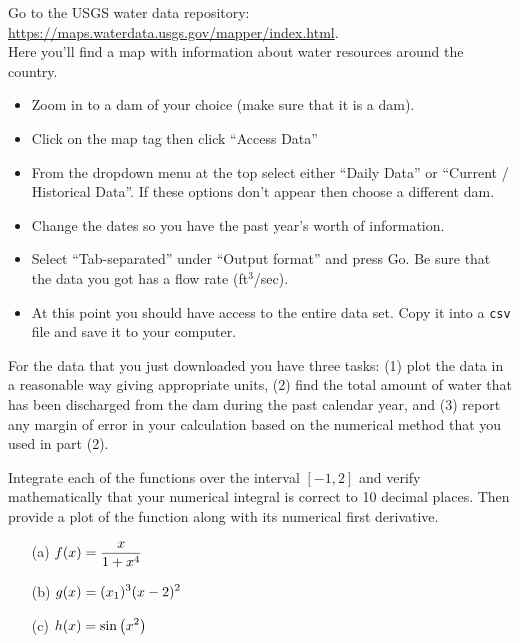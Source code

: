 \begin{problem}
    Go to the USGS water data repository: \\
    \href{https://maps.waterdata.usgs.gov/mapper/index.html}{https://maps.waterdata.usgs.gov/mapper/index.html}.\\
    Here you'll find a map with information about water resources around the country.
    \begin{itemize}
        \item Zoom in to a dam of your choice (make sure that it is a dam).
        \item Click on the map tag then click ``Access Data''
        \item From the dropdown menu at the top select either ``Daily Data'' or ``Current
            / Historical Data''.  If these options don't appear then choose a different
            dam.
        \item Change the dates so you have the past year's worth of information.
        \item Select ``Tab-separated'' under ``Output format'' and press Go.  Be sure that
            the data you got has a flow rate (ft$^3$/sec).
        \item At this point you should have access to the entire data set.  Copy it into a
            \texttt{csv} file and save it to your computer.
    \end{itemize}
    For the data that you just downloaded you have three tasks: (1) plot the data in a
    reasonable way giving appropriate units, (2) find the total amount of water that
    has been discharged from the dam during the past calendar year, and (3) report any
    margin of error in your calculation based on the numerical method that you used in
    part (2).
\end{problem}


\begin{problem}
    Integrate each of the functions over the interval $[-1,2]$ and verify mathematically
    that your numerical integral is correct to 10 decimal places.  Then provide a plot of
    the function along with its numerical first derivative.
    \begin{enumerate}
        \item[(a)] $\displaystyle f(x) = \frac{x}{1+x^4}$
        \item[(b)] $\displaystyle g(x) = (x_1)^3 (x-2)^2$
        \item[(c)] $\displaystyle h(x) = \sin\left(x^2\right)$
    \end{enumerate}
\end{problem}


